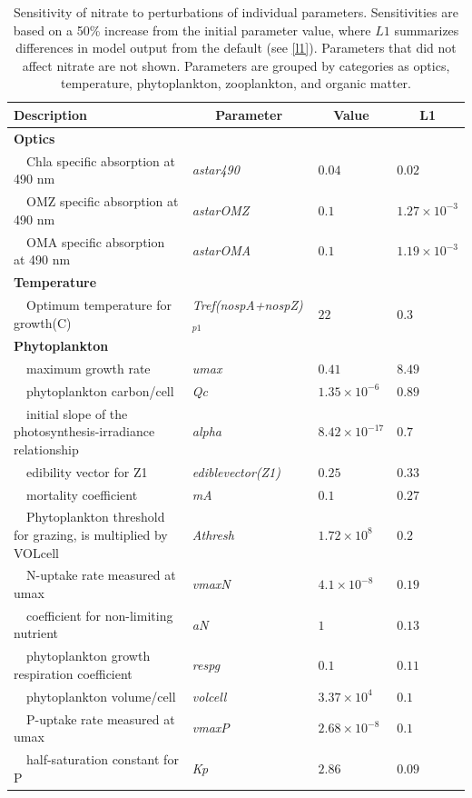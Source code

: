 \documentclass[review]{elsarticle}\usepackage[]{graphicx}\usepackage[]{color}
\begin{document}
\begin{table}[!tbp]
{\footnotesize
\caption{Sensitivity of nitrate to perturbations of individual parameters.  Sensitivities are based on a 50\% increase from the initial parameter value, where $L1$ summarizes differences in model output from the default (see \cref{l1}).  Parameters that did not affect nitrate are not shown.  Parameters are grouped by categories as optics, temperature, phytoplankton, zooplankton, and organic matter.\label{tab:no3sens}} 
\begin{center}
\begin{tabular}{llll}
\hline\hline
\multicolumn{1}{l}{Description}&\multicolumn{1}{c}{Parameter}&\multicolumn{1}{c}{Value}&\multicolumn{1}{c}{L1}\tabularnewline
\hline
{\bfseries Optics}&&&\tabularnewline
~~Chla specific absorption at 490 nm&\textit{astar490}&$0.04$&$0.02$\tabularnewline
~~OMZ specific absorption at 490 nm&\textit{astarOMZ}&$0.1$&$1.27\times 10^{-3}$\tabularnewline
~~OMA specific absorption at 490 nm&\textit{astarOMA}&$0.1$&$1.19\times 10^{-3}$\tabularnewline
\hline
{\bfseries Temperature}&&&\tabularnewline
~~Optimum temperature for growth(C)&\textit{Tref(nospA+nospZ)$_{p1}$}&$22$&$0.3$\tabularnewline
\hline
{\bfseries Phytoplankton}&&&\tabularnewline
~~maximum growth rate&\textit{umax}&$0.41$&$8.49$\tabularnewline
~~phytoplankton carbon/cell&\textit{Qc}&$1.35\times 10^{-6}$&$0.89$\tabularnewline
~~initial slope of the photosynthesis-irradiance relationship&\textit{alpha}&$8.42\times 10^{-17}$&$0.7$\tabularnewline
~~edibility vector for Z1&\textit{ediblevector(Z1)}&$0.25$&$0.33$\tabularnewline
~~mortality coefficient&\textit{mA}&$0.1$&$0.27$\tabularnewline
~~Phytoplankton threshold for grazing, is multiplied by VOLcell&\textit{Athresh}&$1.72\times 10^{8}$&$0.2$\tabularnewline
~~N-uptake rate measured at umax&\textit{vmaxN}&$4.1\times 10^{-8}$&$0.19$\tabularnewline
~~coefficient for non-limiting nutrient&\textit{aN}&$1$&$0.13$\tabularnewline
~~phytoplankton growth respiration coefficient&\textit{respg}&$0.1$&$0.11$\tabularnewline
~~phytoplankton volume/cell&\textit{volcell}&$3.37\times 10^{4}$&$0.1$\tabularnewline
~~P-uptake rate measured at umax&\textit{vmaxP}&$2.68\times 10^{-8}$&$0.1$\tabularnewline
~~half-saturation constant for P&\textit{Kp}&$2.86$&$0.09$\tabularnewline

\end{tabular}
\end{center}}
\end{table}
\end{document}
